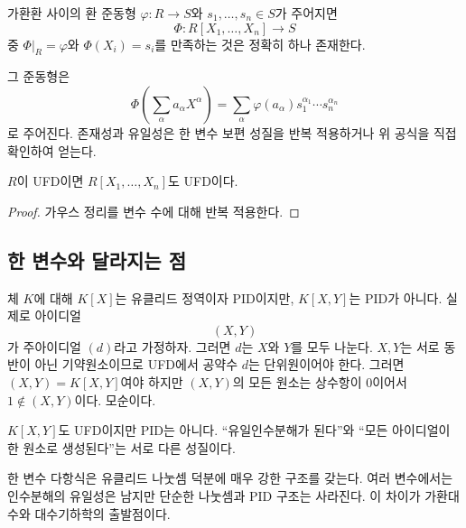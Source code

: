 \begin{theorem}[여러 변수 보편 성질]
가환환 사이의 환 준동형 $\varphi:R\to S$와 $s_1,\dots,s_n\in S$가 주어지면
\[
  \Phi:R[X_1,\dots,X_n]\to S
\]
중 $\Phi|_R=\varphi$와 $\Phi(X_i)=s_i$를 만족하는 것은 정확히 하나 존재한다.
\end{theorem}

그 준동형은
\[
 \Phi\left(\sum_\alpha a_\alpha X^\alpha\right)
 =\sum_\alpha\varphi(a_\alpha)s_1^{\alpha_1}\cdots s_n^{\alpha_n}
\]
로 주어진다. 존재성과 유일성은 한 변수 보편 성질을 반복 적용하거나 위 공식을 직접 확인하여 얻는다.

\begin{corollary}
$R$이 UFD이면 $R[X_1,\dots,X_n]$도 UFD이다.
\end{corollary}

\begin{proof}
가우스 정리를 변수 수에 대해 반복 적용한다.
\end{proof}

\subsection{한 변수와 달라지는 점}

체 $K$에 대해 $K[X]$는 유클리드 정역이자 PID이지만, $K[X,Y]$는 PID가 아니다. 실제로 아이디얼
\[
  (X,Y)
\]
가 주아이디얼 $(d)$라고 가정하자. 그러면 $d$는 $X$와 $Y$를 모두 나눈다. $X,Y$는 서로 동반이 아닌 기약원소이므로 UFD에서 공약수 $d$는 단위원이어야 한다. 그러면 $(X,Y)=K[X,Y]$여야 하지만 $(X,Y)$의 모든 원소는 상수항이 $0$이어서 $1\notin(X,Y)$이다. 모순이다.

\begin{pitfall}
$K[X,Y]$도 UFD이지만 PID는 아니다. ``유일인수분해가 된다''와 ``모든 아이디얼이 한 원소로 생성된다''는 서로 다른 성질이다.
\end{pitfall}

\begin{keyidea}
한 변수 다항식은 유클리드 나눗셈 덕분에 매우 강한 구조를 갖는다. 여러 변수에서는 인수분해의 유일성은 남지만 단순한 나눗셈과 PID 구조는 사라진다. 이 차이가 가환대수와 대수기하학의 출발점이다.
\end{keyidea}
